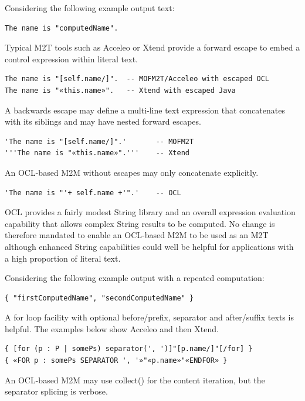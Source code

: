 \documentclass{llncs}
\begin{document}
Considering the following example output text:

\begin{verbatim}
The name is "computedName".
\end{verbatim}

Typical M2T tools such as Acceleo or Xtend provide a forward escape to embed a control expression within literal text. 

\begin{verbatim}
The name is "[self.name/]".  -- MOFM2T/Acceleo with escaped OCL
The name is "«this.name»".   -- Xtend with escaped Java
\end{verbatim}

A backwards escape may define a multi-line text expression that concatenates with its siblings and may have nested forward escapes.

\begin{verbatim}
'The name is "[self.name/]".'       -- MOFM2T
'''The name is "«this.name»".'''    -- Xtend
\end{verbatim}

An OCL-based M2M without escapes may only concatenate explicitly.

\begin{verbatim}
'The name is "'+ self.name +'".'    -- OCL
\end{verbatim}

OCL provides a fairly modest String library and an overall expression evaluation capability that allows complex String results to be computed. No change is therefore mandated to enable an OCL-based M2M to be used as an M2T although enhanced String capabilities could well be helpful for applications with a high proportion of literal text.

Considering the following example output with a repeated computation:

\begin{verbatim}
{ "firstComputedName", "secondComputedName" }
\end{verbatim}

A for loop facility with optional before/prefix, separator and after/suffix texts is helpful. The examples below show Acceleo and then Xtend.

\begin{verbatim}
{ [for (p : P | somePs) separator(', ')]"[p.name/]"[/for] }
{ «FOR p : somePs SEPARATOR ', '»"«p.name»"«ENDFOR» } 
\end{verbatim}

An OCL-based M2M may use collect() for the content iteration, but the separator splicing is verbose.
\end{document}
